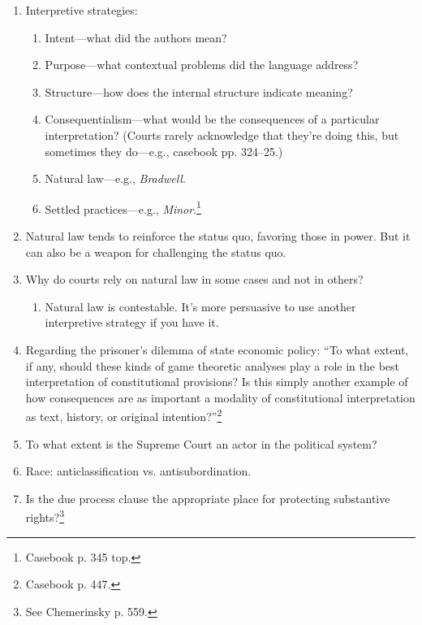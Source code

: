 \begin{enumerate}
    \item Interpretive strategies:
    \begin{enumerate}
        \item Intent---what did the authors mean?
        \item Purpose---what contextual problems did the language address?
        \item Structure---how does the internal structure indicate meaning?
        \item Consequentialism---what would be the consequences of a 
        particular interpretation? (Courts rarely acknowledge that they're 
        doing this, but sometimes they do---e.g., casebook pp. 324--25.)
        \item Natural law---e.g., \emph{Bradwell}.
        \item Settled practices---e.g., \emph{Minor}.\footnote{Casebook p. 345 
        top.}
    \end{enumerate}
    \item Natural law tends to reinforce the status quo, favoring those in 
    power. But it can also be a weapon for challenging the status quo.
    \item Why do courts rely on natural law in some cases and not in others?
    \begin{enumerate}
        \item Natural law is contestable. It's more persuasive to use another 
        interpretive strategy if you have it.
    \end{enumerate}
    \item Regarding the prisoner's dilemma of state economic policy: ``To what 
    extent, if any, should these kinds of game theoretic analyses play a role 
    in the best interpretation of constitutional provisions? Is this simply 
    another example of how consequences are as important a modality of 
    constitutional interpretation as text, history, or original 
    intention?''\footnote{Casebook p. 447.}
    \item To what extent is the Supreme Court an actor in the political 
    system?
    \item Race: anticlassification vs. antisubordination.
    \item Is the due process clause the appropriate place for protecting 
    substantive rights?\footnote{See Chemerinsky p. 559.}
\end{enumerate}

